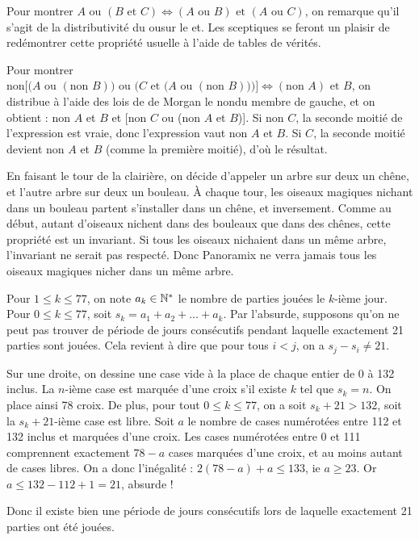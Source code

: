 \begin{sol}
Pour montrer $A \text{ ou } (B \text{ et } C) \iff (A \text{ ou } B) \text{ et } (A \text{ ou } C)$,
on remarque qu'il s'agit de la distributivité du \og ou\fg sur le \og et\fg. Les sceptiques
se feront un plaisir de redémontrer cette propriété usuelle à l'aide de tables de vérités.

Pour montrer $\text{non} \big [ \big ( A \text{\ ou\ } (\text{non\ } B) \big ) \text{\ ou\ } \big ( C \text{\ et\ } \big ( A \text{\ ou\ } (\text{non\ } B)
\big ) \big ) \big ]
\iff (\text{non\ } A) \text{\ et\ } B$, on distribue à l'aide des lois de 
de Morgan le \og non\fg du membre de gauche, et on obtient : 
non $A$ et $B$ et [non $C$ ou (non $A$ et $B$)]. Si non $C$, la seconde
moitié de l'expression est vraie, donc l'expression vaut non $A$ et $B$.
Si $C$, la seconde moitié devient non $A$ et $B$ (comme la première moitié),
d'où le résultat.
\end{sol}


\begin{sol}
En faisant le tour de la clairière, on décide d'appeler un arbre sur deux un chêne,
et l'autre arbre sur deux un bouleau. \`A chaque tour, les oiseaux magiques nichant
dans un bouleau partent s'installer dans un chêne, et inversement. Comme au début,
autant d'oiseaux nichent dans des bouleaux que dans des chênes, cette propriété est
un invariant. Si tous les oiseaux nichaient dans un même arbre, l'invariant ne serait pas
respecté. Donc Panoramix ne verra jamais tous les oiseaux magiques nicher dans un même arbre. 
\end{sol}

\begin{sol}
Pour $1\le k\le 77$, on note $a_k\in\mathbb{N}^*$ le nombre de parties jouées le 
$k$-ième jour. Pour $0\le k\le 77$, soit $s_k=a_1+a_2+\ldots+a_k$. Par
l'absurde, supposons qu'on ne peut pas trouver de période de jours consécutifs 
pendant laquelle exactement 21 parties sont jouées. Cela revient à dire 
que pour tous $i<j$, on a $s_j-s_i\ne 21$.

Sur une droite, on dessine une case vide à la place de chaque entier de 0 à
132 inclus. La $n$-ième case est marquée d'une croix s'il existe $k$ tel
que $s_k=n$. On place ainsi 78 croix. De plus, pour tout $0\le k\le 77$, 
on a soit $s_k + 21>132$, soit la $s_k+21$-ième case est libre. Soit $a$
le nombre de cases numérotées entre 112 et 132 inclus et marquées d'une croix.
Les cases numérotées entre 0 et 111 comprennent exactement $78-a$ cases marquées
d'une croix, et au moins autant de cases libres. On a donc l'inégalité :
$2(78-a)+a\le 133$, ie $a\ge 23$. Or $a\le 132 - 112 +1 = 21$, absurde !

Donc il existe bien une période de jours consécutifs lors de laquelle exactement
21 parties ont été jouées.


\end{sol}


